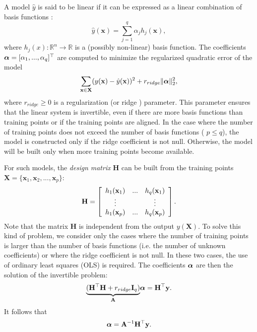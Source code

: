 \documentclass[12pt]{article}
\def\R{{\mathbb{R}}}
\newcommand{\y}{\mathbf{y}}
\newcommand{\I}{\mathbf{I}}
\newcommand{\A}{\mathbf{A}}
\newcommand{\x}{\mathbf{x}}
\renewcommand{\H}{\mathbf{H}}
\newcommand{\yh}{\hat{y}}
\newcommand{\X}{\mathbf{X}}
\renewcommand{\t}{^\top}
\begin{document}
A model $\yh$ is said to be linear if it can be expressed as a linear combination of basis functions \cite{mardia1979multivariate,STIGLER1974431,Gergonne1974439,orr1996introduction}:
\begin{equation}
  \yh(\x) = \sum_{j=1}^q \alpha_j h_j(\x),
\end{equation}
where $h_j(x):\R^n\rightarrow\R$ is a (possibly non-linear) basis function. 
The coefficients $\a = [\alpha_1,...,\alpha_q]\t$ are computed to minimize the regularized quadratic error of the model
\begin{displaymath}
  \sum_{\x\in\X} (y(\x)-\yh(\x))^2 + r_{ridge} \|\a\|^2_2,
\end{displaymath}
where $r_{ridge} \ge 0$ is a regularization (or ridge \cite{orr1996introduction}) parameter. This parameter ensures that the linear system is invertible, even if there are more basis functions than training points or if the training points are aligned. 
In the case where the number of training points does not exceed the number of basis functions (
  $p\le q$), the model is constructed only if the ridge coefficient is not null. 
Otherwise, the model will be built only when more training points become available. 

For such models, the \emph{design matrix} $\H$ can be built from the training points $\X = \{\x_1,\x_2,...,\x_p\}$:
\begin{equation}
  \H  
  =\left[\begin{array}{c c c}
    h_1(\x_1) & ... & h_q(\x_1) \\
      \vdots  &     & \vdots  \\
    h_1(\x_p) & ... & h_q(\x_p) \\
  \end{array}\right].
  \label{eq:design-matrix}
\end{equation}
Note that the matrix $\H$ is independent from the output $y(\X)$. To solve this kind of problem, we consider only the cases where the number of training points is larger than the number of basis functions (i.e. the number of unknown coefficients) or where the ridge coefficient is not null. In these two cases, the use of ordinary least squares (OLS) is required. The coefficients $\boldsymbol{\alpha}$ are then the solution of the invertible problem:
\begin{equation}
  \underset{\A}{\underbrace{(\H\t \H+r_{ridge} \I_q)}}\a = \H\t\y. 
\end{equation}
It follows that
\begin{equation}
  \a  = \A^{-1} \H\t \y.
\end{equation}
\end{document}
